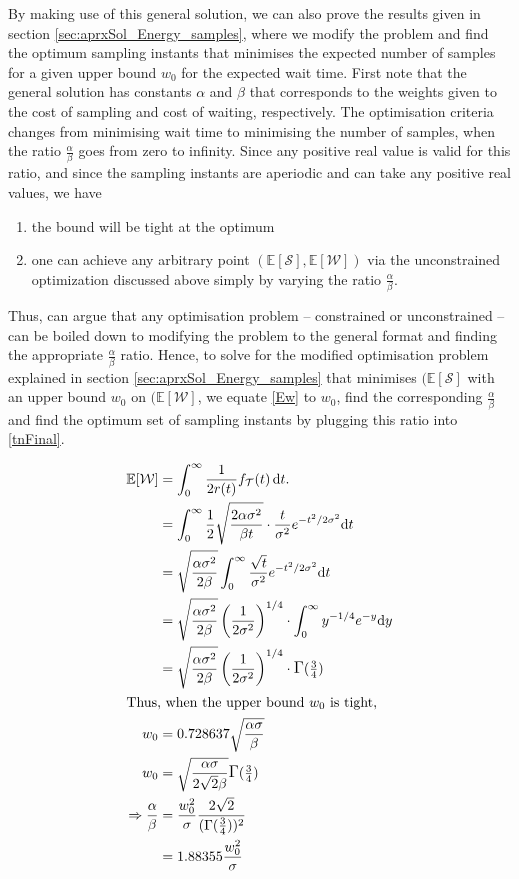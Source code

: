 By making use of this general solution, we can also prove the results given in section \ref{sec:aprxSol_Energy_samples}, where we modify the problem and find the optimum sampling instants that minimises the expected number of samples for a given upper bound $w_0$ for the expected wait time. 
First note that the general solution has constants $\alpha$ and $\beta$ that corresponds to the weights given to the cost of sampling and cost of waiting, respectively. The optimisation criteria changes from minimising wait time to minimising the number of samples, when the ratio $\frac{\alpha}{\beta}$ goes from zero to infinity. Since any positive real value is valid for this ratio, and since the sampling instants are aperiodic and can take any positive real values, we have
\begin{enumerate}
    \item the bound will be tight at the optimum
    \item one can achieve any arbitrary point $(\mathbb{E}[\mathcal{S}],\mathbb{E}[\mathcal{W}])$ via the unconstrained optimization discussed above simply by varying the ratio $\frac{\alpha}{\beta}$.
\end{enumerate}
Thus, can argue that any optimisation problem -- constrained or unconstrained -- can be boiled down to modifying the problem to the general format and finding the appropriate $\frac{\alpha}{\beta}$ ratio. Hence, to solve for the modified optimisation problem explained in section \ref{sec:aprxSol_Energy_samples} that minimises $(\mathbb{E}[\mathcal{S}]$ with an upper bound $w_0$ on $(\mathbb{E}[\mathcal{W}]$, we equate \cref{Ew} to $w_0$, find the corresponding $\frac{\alpha}{\beta}$ and find the optimum set of sampling instants by plugging this ratio into \cref{tnFinal}. 

\begin{alignat*}{1}
\mathbb{E}[\mathcal{W}]&=\int_{0}^{\infty}\dfrac{1}{2r(t)}f_\mathcal{T}(t)\,\mathrm{d}t.\nonumber\\
&=\int_{0}^{\infty}\frac{1}{2}\sqrt{\frac{2\alpha\sigma^2}{\beta t}}\cdot \frac{t}{\sigma^2}e^{-{t^2}/{2\sigma^2}}\mathrm{d}t\\
&=\sqrt{\frac{\alpha\sigma^2}{2\beta}}\int_{0}^{\infty}\frac{\sqrt{t}}{\sigma^2}e^{-{t^2}/{2\sigma^2}}\mathrm{d}t\\
&=\sqrt{\frac{\alpha\sigma^2}{2\beta}}\left({\frac{1}{{2}\sigma^2}}\right)^{1/4}\cdot\int_{0}^{\infty}y^{-1/4}e^{-y}\mathrm{d}y\\
&=\sqrt{\frac{\alpha\sigma^2}{2\beta}}\left({\frac{1}{{2}\sigma^2}}\right)^{1/4}\cdot\mathlarger{\Gamma}(\tfrac{3}{4})\\
\intertext{Thus, when the upper bound $w_0$ is tight,}
w_0&=0.728637\sqrt{\frac{\alpha\sigma}{\beta}}\\
w_0&=\sqrt{\frac{\alpha\sigma}{2\sqrt{2}\beta}}\mathlarger{\Gamma}(\tfrac{3}{4})\\
\Rightarrow\frac{\alpha}{\beta}&=\frac{w_0^2}{\sigma}\frac{2\sqrt{2}}{(\mathlarger{\Gamma}(\tfrac{3}{4}))^2}\\&=1.88355\frac{w_0^2}{\sigma}
\end{alignat*}

